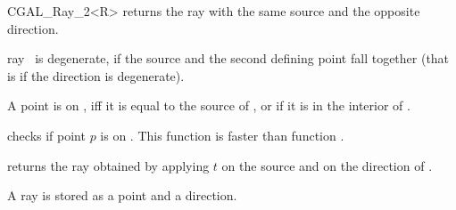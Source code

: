 \begin{ccClassTemplate} {CGAL_Ray_2<R>}
       {returns the ray with the same source and the opposite direction.}

       {ray \ccVar\ is degenerate, if the source and the second defining
        point fall together (that is if the direction is degenerate).}

       {}

       {}

       {A point is on \ccVar, iff it is equal to the source
        of \ccVar, or if it is in the interior of \ccVar.}

       {checks if point $p$ is on \ccVar. This function is faster
        than function .
        }

       {returns the ray obtained by applying $t$ on the source
        and on the direction of \ccVar.}

\ccImplementation

A ray is stored as a point and a direction.


\end{ccClassTemplate} 

%
%
%
